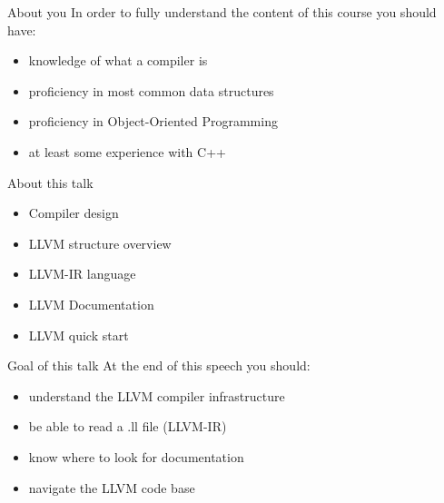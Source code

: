 \documentclass[10pt,mathserif]{beamer}
\begin{document}
\begin{frame}[t]{About you}
  In order to fully understand the content of this course you should have:
  \begin{itemize}
    \vfill
    \item knowledge of what a compiler is
    \vfill
    \item proficiency in most common data structures
    \vfill
    \item proficiency in Object-Oriented Programming
    \vfill
    \item at least some experience with C++
  \end{itemize}
\end{frame}

\begin{frame}[t]{About this talk}
  \begin{Large}
  \vfill
  \begin{itemize}
    \vfill
    \item Compiler design
    \vfill
    \item LLVM structure overview
    \vfill
    \item LLVM-IR language
    \vfill
    \item LLVM Documentation
    \vfill
    \item LLVM quick start
  \end{itemize}
  \vfill
\end{Large}
\end{frame}

\begin{frame}[t]{Goal of this talk}
  At the end of this speech you should:
  \begin{itemize}
    \vfill
    \item understand the LLVM compiler infrastructure
    \vfill
    \item be able to read a .ll file (LLVM-IR)
    \vfill
    \item know where to look for documentation
    \vfill
    \item navigate the LLVM code base
  \end{itemize}
\end{frame}

\end{document}
